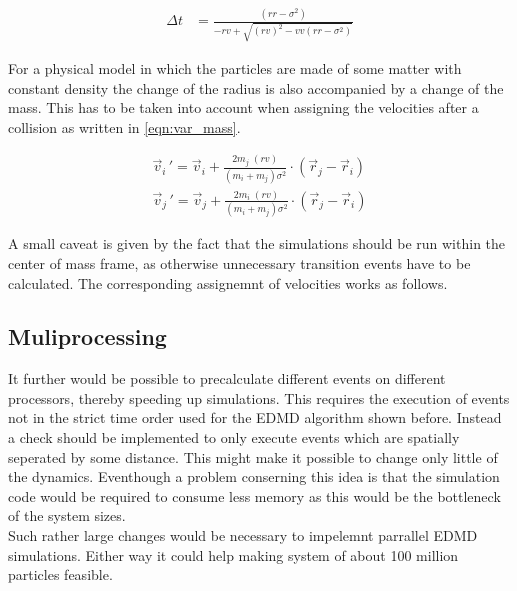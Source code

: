 \begin{align}
\label{eqn:collision_prediction}
\Delta t &= \frac{(rr - \sigma^2 )}{ - rv + \sqrt{ (rv)^2  - vv (rr - \sigma^2 )}}
\end{align} 

For a physical model in which the particles are made of some matter with constant density the change of the radius is also accompanied by a change of the mass. This has to be taken into account when assigning the velocities after a collision as written in \autoref{eqn:var_mass}.

\begin{align}
\label{eqn:var_mass}
\vec{v}_i{\,'} = \vec{v}_i + \frac{2 m_j \; (rv)}{(m_i + m_j) \sigma^2} \cdot (\vec{r}_j - \vec{r}_i) \nonumber \\
\vec{v}_j{\,'} = \vec{v}_j + \frac{2 m_i \; (rv)}{(m_i + m_j) \sigma^2} \cdot (\vec{r}_j - \vec{r}_i)
\end{align}

A small caveat is given by the fact that the simulations should be run within the center of mass frame, as otherwise unnecessary transition events have to be calculated. The corresponding assignemnt of velocities works as follows.

\subsection{Muliprocessing}
\label{sec:extension_MP}
It further would be possible to precalculate different events on different processors, thereby speeding up simulations. This requires the execution of events not in the strict time order used for the EDMD algorithm shown before. Instead a check should be implemented to only execute events which are spatially seperated by some distance. This might make it possible to change only little of the dynamics. Eventhough a problem conserning this idea is that the simulation code would be required to consume less memory as this would be the bottleneck of the system sizes.\\
Such rather large changes would be necessary to impelemnt parrallel EDMD simulations. Either way it could help making system of about 100 million particles feasible.   


